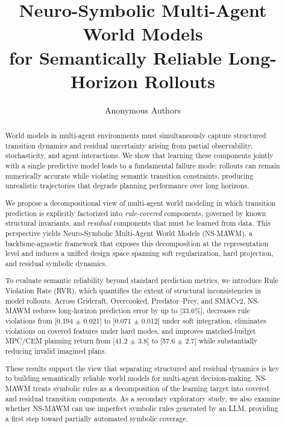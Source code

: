 \documentclass{article}
\title{Neuro-Symbolic Multi-Agent World Models\\
    for Semantically Reliable Long-Horizon Rollouts}
\author{Anonymous Authors}
\theoremstyle{plain}
\theoremstyle{definition}
\theoremstyle{remark}
\begin{document}
\maketitle


\begin{abstract}
  World models in multi-agent environments must simultaneously capture structured transition dynamics and residual uncertainty arising from partial observability, stochasticity, and agent interactions. We show that learning these components jointly with a single predictive model leads to a fundamental failure mode: rollouts can remain numerically accurate while violating semantic transition constraints, producing unrealistic trajectories that degrade planning performance over long horizons.

  We propose a decompositional view of multi-agent world modeling in which transition prediction is explicitly factorized into \emph{rule-covered} components, governed by known structural invariants, and \emph{residual} components that must be learned from data. This perspective yields Neuro-Symbolic Multi-Agent World Models (NS-MAWM), a backbone-agnostic framework that exposes this decomposition at the representation level and induces a unified design space spanning soft regularization, hard projection, and residual symbolic dynamics.

  To evaluate semantic reliability beyond standard prediction metrics, we introduce Rule Violation Rate (RVR), which quantifies the extent of structural inconsistencies in model rollouts. Across Gridcraft, Overcooked, Predator--Prey, and SMACv2, NS-MAWM reduces long-horizon prediction error by up to [33.6\%], decreases rule violations from [0.194 $\pm$ 0.021] to [0.071 $\pm$ 0.012] under soft integration, eliminates violations on covered features under hard modes, and improves matched-budget MPC/CEM planning return from [41.2 $\pm$ 3.8] to [57.6 $\pm$ 2.7] while substantially reducing invalid imagined plans.

  These results support the view that separating structured and residual dynamics is key to building semantically reliable world models for multi-agent decision-making. NS-MAWM treats symbolic rules as a decomposition of the learning target into covered and residual transition components. As a secondary exploratory study, we also examine whether NS-MAWM can use imperfect symbolic rules generated by an LLM, providing a first step toward partially automated symbolic coverage.
\end{abstract}
\end{document}
